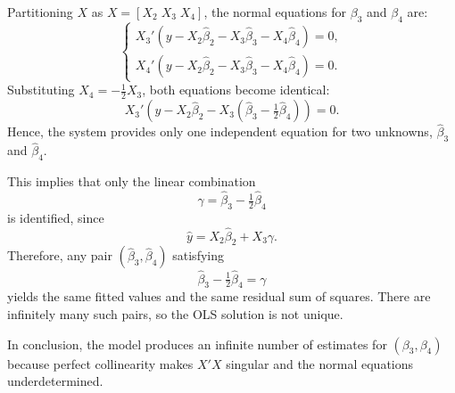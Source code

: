 \begin{enumerate}[label=(\roman*)]
Partitioning $X$ as $X = [X_2 \; X_3 \; X_4]$, the normal equations for $\beta_3$ and $\beta_4$ are:
\[
\begin{cases}
X_3'(y - X_2\hat{\beta}_2 - X_3\hat{\beta}_3 - X_4\hat{\beta}_4) = 0, \\
X_4'(y - X_2\hat{\beta}_2 - X_3\hat{\beta}_3 - X_4\hat{\beta}_4) = 0.
\end{cases}
\]
Substituting $X_4 = -\tfrac{1}{2}X_3$, both equations become identical:
\[
X_3'(y - X_2\hat{\beta}_2 - X_3(\hat{\beta}_3 - \tfrac{1}{2}\hat{\beta}_4)) = 0.
\]
Hence, the system provides only one independent equation for two unknowns, $\hat{\beta}_3$ and $\hat{\beta}_4$.

This implies that only the linear combination
\[
\gamma = \hat{\beta}_3 - \tfrac{1}{2}\hat{\beta}_4
\]
is identified, since
\[
\hat{y} = X_2\hat{\beta}_2 + X_3\gamma.
\]
Therefore, any pair $(\hat{\beta}_3, \hat{\beta}_4)$ satisfying
\[
\hat{\beta}_3 - \tfrac{1}{2}\hat{\beta}_4 = \gamma
\]
yields the same fitted values and the same residual sum of squares. 
There are infinitely many such pairs, so the OLS solution is not unique.

In conclusion, the model produces an infinite number of estimates for $(\beta_3,\beta_4)$ 
because perfect collinearity makes $X'X$ singular and the normal equations underdetermined.

\end{enumerate}


